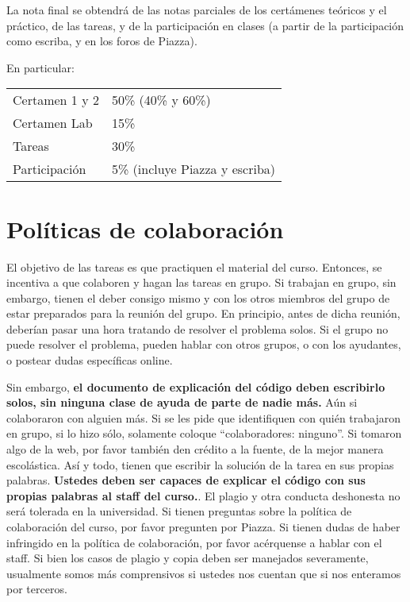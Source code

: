 \documentclass[11pt]{article}
\begin{document}
La nota final se obtendr\'a de las notas parciales de los cert\'amenes
te\'oricos y el pr\'actico, de las tareas, y de la participaci\'on en clases
(a partir de la participaci\'on como escriba, y en los foros de Piazza).

En particular:

\begin{table}[h]
  \centering
  \begin{tabular}[h]{ll}
    Certamen 1 y 2 & 50\% (40\% y 60\%)\\
    Certamen Lab & 15\%\\
    Tareas & 30\%\\
    Participaci\'on & 5\% (incluye Piazza y escriba)
  \end{tabular}
\end{table}

\section{Pol\'iticas de colaboraci\'on}
\label{sec:col}

El objetivo de las tareas es que practiquen el material del
curso. Entonces, se incentiva a que colaboren y hagan las tareas en
grupo. Si trabajan en grupo, sin embargo, tienen el deber consigo
mismo y con los otros miembros del grupo de estar preparados para la
reuni\'on del grupo. En principio, antes de dicha reuni\'on, deber\'ian
pasar una hora tratando de resolver el problema solos. Si el grupo no
puede resolver el problema, pueden hablar con otros grupos, o con los
ayudantes, o postear dudas espec\'ificas online.

Sin embargo, {\bf el documento de explicaci\'on del c\'odigo deben
  escribirlo solos, sin ninguna clase de ayuda de parte de nadie
  m\'as.}  A\'un si colaboraron con alguien m\'as. Si se les pide que
identifiquen con qui\'en trabajaron en grupo, si lo hizo s\'olo,
solamente coloque ``colaboradores: ninguno''. Si tomaron algo de la
web, por favor tambi\'en den cr\'edito a la fuente, de la mejor manera
escol\'astica. As\'i y todo, tienen que escribir la soluci\'on de la
tarea en sus propias palabras. {\bf Ustedes deben ser capaces de
  explicar el c\'odigo con sus propias palabras al staff del
  curso.}. El plagio y otra conducta deshonesta no ser\'a tolerada en
la universidad. Si tienen preguntas sobre la pol\'itica de
colaboraci\'on del curso, por favor pregunten por Piazza. Si tienen
dudas de haber infringido en la pol\'itica de colaboraci\'on, por
favor ac\'erquense a hablar con el staff. Si bien los casos de plagio
y copia deben ser manejados severamente, usualmente somos m\'as
comprensivos si ustedes nos cuentan que si nos enteramos por terceros.
\end{document}
